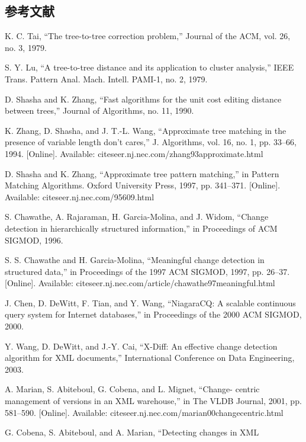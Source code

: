 \begin{spacing}{0.9}
\section*{参考文献}
\begin{enumerate}[{[}1{]}]
\item{\small K. C. Tai, “The tree-to-tree correction problem,” Journal of the ACM,
  vol. 26, no. 3, 1979.}
\item{\small S. Y. Lu, “A tree-to-tree distance and its application to cluster
  analysis,” IEEE Trans. Pattern Anal. Mach. Intell. PAMI-1, no. 2, 1979.}
\item{\small D. Shasha and K. Zhang, “Fast algorithms for the unit cost editing
  distance between trees,” Journal of Algorithms, no. 11, 1990.}
\item{\small K. Zhang, D. Shasha, and J. T.-L. Wang, “Approximate tree matching in the
  presence of variable length don’t cares,” J. Algorithms, vol. 16, no. 1, pp.
  33–66, 1994. [Online]. Available: citeseer.nj.nec.com/zhang93approximate.html}
\item{\small D. Shasha and K. Zhang, “Approximate tree pattern matching,” in Pattern
  Matching Algorithms. Oxford University Press, 1997, pp. 341–371. [Online].
  Available: citeseer.nj.nec.com/95609.html}
\item{\small S. Chawathe, A. Rajaraman, H. Garcia-Molina, and J. Widom, “Change
  detection in hierarchically structured information,” in Proceedings of ACM
  SIGMOD, 1996.}
\item{\small S. S. Chawathe and H. Garcia-Molina, “Meaningful change detection in
  structured data,” in Proceedings of the 1997 ACM SIGMOD, 1997, pp. 26–37.
  [Online]. Available: citeseer.nj.nec.com/article/chawathe97meaningful.html}
\item{\small J. Chen, D. DeWitt, F. Tian, and Y. Wang, “NiagaraCQ: A scalable
  continuous query system for Internet databases,” in Proceedings of the 2000
  ACM SIGMOD, 2000.}
\item{\small Y. Wang, D. DeWitt, and J.-Y. Cai, “X-Diff: An effective change detection
  algorithm for XML documents,” International Conference on Data Engineering,
  2003.}
\item{\small A. Marian, S. Abiteboul, G. Cobena, and L. Mignet, “Change- centric
  management of versions in an XML warehouse,” in The VLDB Journal, 2001, pp.
  581–590. [Online]. Available: citeseer.nj.nec.com/marian00changecentric.html}
\item{\small G. Cobena, S. Abiteboul, and A. Marian, “Detecting changes in XML
}
\end{enumerate}
\end{spacing}
